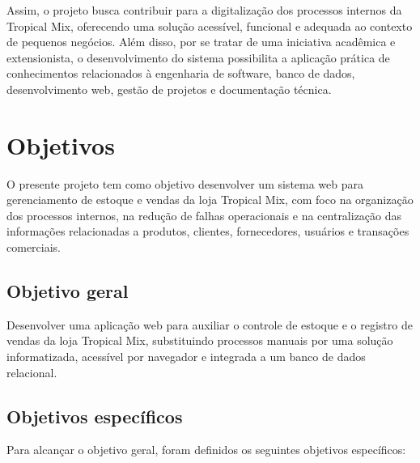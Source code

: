 Assim, o projeto busca contribuir para a digitalização dos processos internos da Tropical Mix, oferecendo uma solução acessível, funcional e adequada ao contexto de pequenos negócios. Além disso, por se tratar de uma iniciativa acadêmica e extensionista, o desenvolvimento do sistema possibilita a aplicação prática de conhecimentos relacionados à engenharia de software, banco de dados, desenvolvimento web, gestão de projetos e documentação técnica.

\section{Objetivos}

O presente projeto tem como objetivo desenvolver um sistema web para gerenciamento de estoque e vendas da loja Tropical Mix, com foco na organização dos processos internos, na redução de falhas operacionais e na centralização das informações relacionadas a produtos, clientes, fornecedores, usuários e transações comerciais.

\subsection{Objetivo geral}

Desenvolver uma aplicação web para auxiliar o controle de estoque e o registro de vendas da loja Tropical Mix, substituindo processos manuais por uma solução informatizada, acessível por navegador e integrada a um banco de dados relacional.

\subsection{Objetivos específicos}

Para alcançar o objetivo geral, foram definidos os seguintes objetivos específicos:

